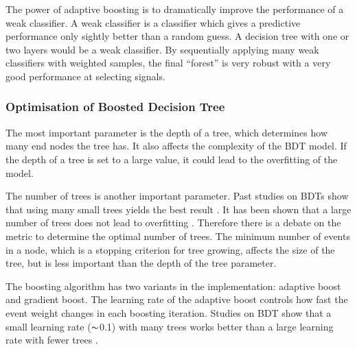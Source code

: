 The power of  adaptive boosting  is to dramatically improve the performance of a weak classifier. A weak classifier is a classifier which gives a predictive performance only sightly better than a random guess. A decision tree with one or two layers would be a weak classifier. By sequentially applying many weak classifiers with weighted samples, the final ``forest'' is very robust with a very good performance at selecting signals.



\subsubsection{Optimisation of Boosted Decision Tree}
\label{sec:pandoraMVAbdtVar}


The most important parameter is the depth of a tree, which determines how many end nodes the tree has. It also affects the complexity of the BDT model. If the depth of a tree is set to a large value, it could lead to the overfitting of the model.

The number of trees is another important parameter. Past studies on BDTs show that using many small trees yields the best result \cite{hastie2009elements}. It has been shown that a large number of trees  does not lead to overfitting \cite{hastie2009elements}. Therefore there is a debate on the metric to determine the optimal number of trees. The minimum number of events in a node, which is a stopping criterion for tree growing, affects the size of the tree, but is less important than the depth of the tree parameter.

The boosting algorithm has two variants in the \TMVA implementation: adaptive boost and gradient boost. The learning rate of the adaptive boost  controls how fast the event weight changes in each boosting iteration. Studies on BDT show that a small learning rate ($\thicksim$0.1) with many trees works better than a large learning rate with fewer trees \cite{hastie2009elements}.

